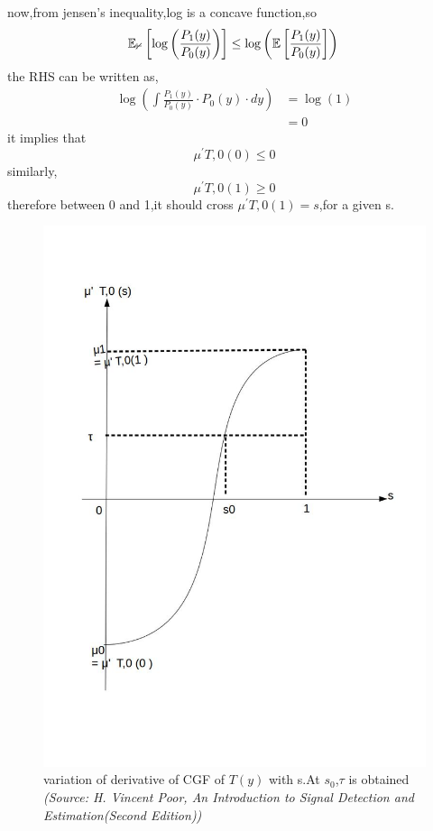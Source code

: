 \documentclass[a4paper,english,12pt]{article}
\begin{document}
now,from jensen's inequality,log is a concave function,so
\begin{equation*}
\mathbb{E_0}\left[\log\left(\frac{P_1(y)}{P_0(y)}\right)\right]\leq\log\left(\mathbb{E}\left[\frac{P_1(y)}{P_0(y)}\right]\right)\\
\end{equation*}
the RHS can be written as,
\begin{align*}
\log\left(\int{\frac{P_1(y)}{P_0(y)}\cdot P_0(y) }\cdot dy\right)
&=\log(1)\\
&=0
\end{align*}
it implies that\\
\[\mu^\prime{T,0}(0)\leq 0\]
similarly,
\[\mu^\prime{T,0}(1)\geq 0\]
therefore between 0 and 1,it should cross $\mu^\prime{T,0}(1)=s$,for a given s.
\begin{figure}[hbtp]
	\centering
	\includegraphics[scale=0.20]{Figures/Untitled1.jpg}
	\caption{variation of derivative of CGF of $T(y)$ with s.At $s_0$,$\tau$ is obtained  \\ \textit{(Source: H. Vincent Poor, An Introduction to Signal Detection and Estimation(Second Edition))}}
	\label{fn2}
\end{figure}\\
\end{document}
